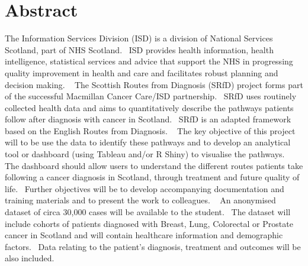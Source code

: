 %
\chapter*{Abstract}
\label{sec:abstract}
\vspace*{-10mm}


The Information Services Division (ISD) is a division of National Services Scotland, part of NHS Scotland.  ISD provides health information, health intelligence, statistical services and advice that support the NHS in progressing quality improvement in health and care and facilitates robust planning and decision making.
 
The Scottish Routes from Diagnosis (SRfD) project forms part of the successful Macmillan Cancer Care/ISD partnership.  SRfD uses routinely collected health data and aims to quantitatively describe the pathways patients follow after diagnosis with cancer in Scotland.  SRfD is an adapted framework based on the English Routes from Diagnosis.
 
The key objective of this project will to be use the data to identify these pathways and to develop an analytical tool or dashboard (using Tableau and/or R Shiny) to visualise the pathways.  The dashboard should allow users to understand the different routes patients take following a cancer diagnosis in Scotland, through treatment and future quality of life.  Further objectives will be to develop accompanying documentation and training materials and to present the work to colleagues.
 
An anonymised dataset of circa 30,000 cases will be available to the student.  The dataset will include cohorts of patients diagnosed with Breast, Lung, Colorectal or Prostate cancer in Scotland and will contain healthcare information and demographic factors.  Data relating to the patient’s diagnosis, treatment and outcomes will be also included.  
 

\vspace*{20mm}



